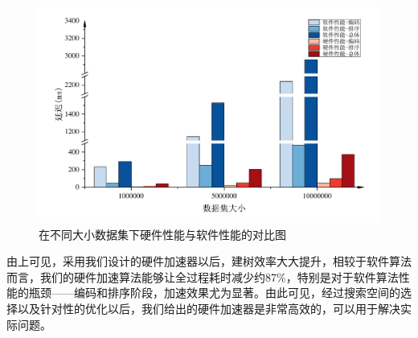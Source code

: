 \begin{figure}[htbp]
    \centering
    \includegraphics[width=\linewidth]{figures/Octree.pdf}
    \caption{在不同大小数据集下硬件性能与软件性能的对比图}
    \label{fig:Octree_comparison}
\end{figure}


由上可见，采用我们设计的硬件加速器以后，建树效率大大提升，相较于软件算法而言，我们的硬件加速算法能够让全过程耗时减少约87\%，特别是对于软件算法性能的瓶颈——编码和排序阶段，加速效果尤为显著。由此可见，经过搜索空间的选择以及针对性的优化以后，我们给出的硬件加速器是非常高效的，可以用于解决实际问题。

